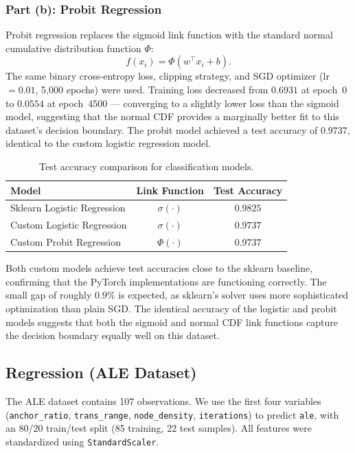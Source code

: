 \documentclass[11pt]{article}
\begin{document}
\subsubsection*{Part (b): Probit Regression}

Probit regression replaces the sigmoid link function with the standard normal
cumulative distribution function $\Phi$:
\[
    f(x_i) = \Phi(w^\top x_i + b).
\]
The same binary cross-entropy loss, clipping strategy, and SGD optimizer
(lr$=0.01$, 5{,}000 epochs) were used. Training loss decreased from $0.6931$
at epoch~0 to $0.0554$ at epoch~4500 --- converging to a slightly lower loss
than the sigmoid model, suggesting that the normal CDF provides a marginally
better fit to this dataset's decision boundary. The probit model achieved a
test accuracy of $\mathbf{0.9737}$, identical to the custom logistic regression
model.

\begin{table}[h]
    \centering
    \caption{Test accuracy comparison for classification models.}
    \label{tab:classification}
    \begin{tabular}{lcc}
        \toprule
        \textbf{Model} & \textbf{Link Function} & \textbf{Test Accuracy} \\
        \midrule
        Sklearn Logistic Regression & $\sigma(\cdot)$  & $0.9825$ \\
        Custom Logistic Regression  & $\sigma(\cdot)$  & $0.9737$ \\
        Custom Probit Regression    & $\Phi(\cdot)$    & $0.9737$ \\
        \bottomrule
    \end{tabular}
\end{table}

Both custom models achieve test accuracies close to the sklearn baseline,
confirming that the PyTorch implementations are functioning correctly. The
small gap of roughly $0.9\%$ is expected, as sklearn's solver uses more
sophisticated optimization than plain SGD. The identical accuracy of the
logistic and probit models suggests that both the sigmoid and normal CDF link
functions capture the decision boundary equally well on this dataset.

\subsection*{Regression (ALE Dataset)}

The ALE dataset contains 107 observations. We use the first four variables
(\texttt{anchor\_ratio}, \texttt{trans\_range}, \texttt{node\_density},
\texttt{iterations}) to predict \texttt{ale}, with an 80/20 train/test split
(85 training, 22 test samples). All features were standardized using
\texttt{StandardScaler}.
\end{document}
